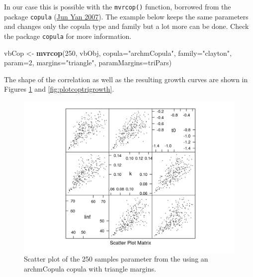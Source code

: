 \documentclass[
]{book}
\newenvironment{Shaded}{\begin{snugshade}}{\end{snugshade}}
\newcommand{\AttributeTok}[1]{\textcolor[rgb]{0.13,0.29,0.53}{#1}}
\newcommand{\DecValTok}[1]{\textcolor[rgb]{0.00,0.00,0.81}{#1}}
\newcommand{\FunctionTok}[1]{\textcolor[rgb]{0.13,0.29,0.53}{\textbf{#1}}}
\newcommand{\NormalTok}[1]{#1}
\newcommand{\OtherTok}[1]{\textcolor[rgb]{0.56,0.35,0.01}{#1}}
\newcommand{\StringTok}[1]{\textcolor[rgb]{0.31,0.60,0.02}{#1}}
\begin{document}
In our case this is possible with the \texttt{mvrcop()} function, borrowed from the package \texttt{copula} (\protect\hyperlink{ref-R-copula}{Jun Yan 2007}). The example below keeps the same parameters and changes only the copula type and family but a lot more can be done. Check the package \texttt{copula} for more information.

\begin{Shaded}
\begin{Highlighting}[]
\NormalTok{vbCop }\OtherTok{\textless{}{-}} \FunctionTok{mvrcop}\NormalTok{(}\DecValTok{250}\NormalTok{, vbObj,}
  \AttributeTok{copula=}\StringTok{"archmCopula"}\NormalTok{,}
  \AttributeTok{family=}\StringTok{"clayton"}\NormalTok{,}
  \AttributeTok{param=}\DecValTok{2}\NormalTok{,}
  \AttributeTok{margins=}\StringTok{"triangle"}\NormalTok{,}
  \AttributeTok{paramMargins=}\NormalTok{triPars)}
\end{Highlighting}
\end{Shaded}

The shape of the correlation as well as the resulting growth curves are shown in Figures \ref{fig:plotcoptriscatter} and \ref{fig:plotcoptrigrowth}.

\begin{figure}
\centering
\includegraphics{_bookdown_files/_main_files/figure-html/plotcoptriscatter-1.png}
\caption{\label{fig:plotcoptriscatter}Scatter plot of the 250 samples parameter from the using an archmCopula copula with triangle margins.}
\end{figure}
\end{document}
